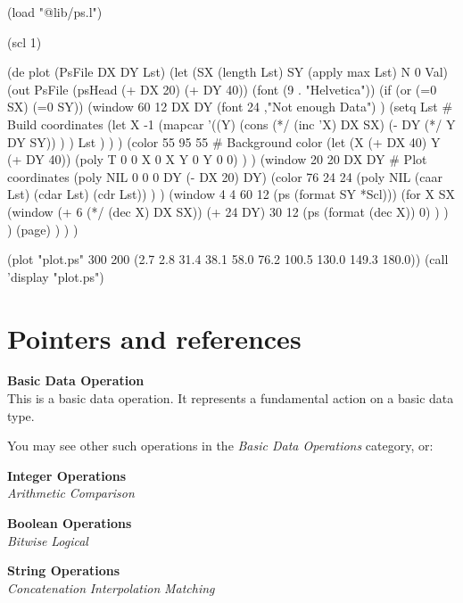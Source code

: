 \begin{wideverbatim}

(load "@lib/ps.l")

(scl 1)

(de plot (PsFile DX DY Lst)
   (let (SX (length Lst)  SY (apply max Lst)  N 0 Val)
      (out PsFile
         (psHead (+ DX 20) (+ DY 40))
         (font (9 . "Helvetica"))
         (if (or (=0 SX) (=0 SY))
            (window 60 12 DX DY
               (font 24 ,"Not enough Data") )
            (setq Lst  # Build coordinates
               (let X -1
                  (mapcar
                     '((Y)
                        (cons
                           (*/ (inc 'X) DX SX)
                           (- DY (*/ Y DY SY)) ) )
                     Lst ) ) )
            (color 55 95 55  # Background color
               (let (X (+ DX 40) Y (+ DY 40))
                  (poly T  0 0  X 0  X Y  0 Y  0 0) ) )
            (window 20 20 DX DY  # Plot coordinates
               (poly NIL 0 0  0 DY  (- DX 20) DY)
               (color 76 24 24
                  (poly NIL (caar Lst) (cdar Lst) (cdr Lst)) ) )
            (window 4 4 60 12 (ps (format SY *Scl)))
            (for X SX
               (window (+ 6 (*/ (dec X) DX SX)) (+ 24 DY) 30 12
                  (ps (format (dec X)) 0) ) ) )
         (page) ) ) )

(plot "plot.ps" 300 200 (2.7 2.8 31.4 38.1 58.0 76.2 100.5 130.0 149.3 180.0))
(call 'display "plot.ps")

\end{wideverbatim}

\pagebreak{}
\section*{Pointers and references}

\textbf{Basic Data Operation}\\ This is a basic data operation. It
represents a fundamental action on a basic data type.

You may see other such operations in the \emph{Basic Data Operations}
category, or:

\textbf{Integer Operations} \\
\emph{Arithmetic} \textbar{} \emph{Comparison}

\textbf{Boolean Operations} \\ \emph{Bitwise} \textbar{}
\emph{Logical}

\textbf{String Operations} \\
\emph{Concatenation} \textbar{} \emph{Interpolation} \textbar{}
\emph{Matching}

